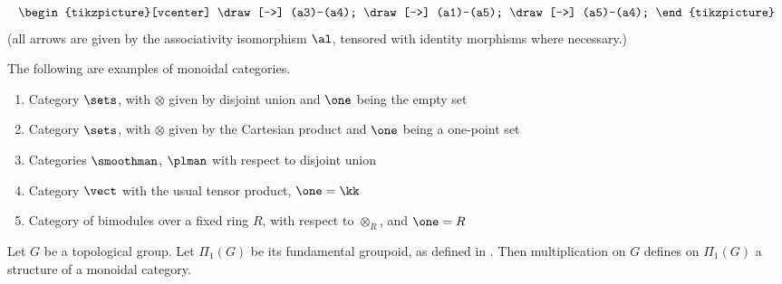 \begin{definition}
\begin{enumerate}
\begin{equation}
\begin{tikzpicture}[vcenter]
          \draw[->] (a3)--(a4);
          \draw[->] (a1)--(a5);
          \draw[->] (a5)--(a4);
        \end{tikzpicture}
      \end{equation}
      (all arrows are given by the associativity isomorphism $\al$, tensored
      with identity morphisms where necessary.)

  \end{enumerate}
\end{definition}

\begin{example}\label{x:monoidal-cat-examples}
The following are examples of monoidal categories.
  \begin{enumerate}
    \item Category $\sets$, with $\otimes$ given by disjoint union and
      $\one$ being the empty set
    \item Category $\sets$, with $\otimes$ given by the Cartesian product
      and $\one$ being a one-point set
    \item Categories $\smoothman$, $\plman$ with respect to disjoint union
    \item Category $\vect$ with the usual tensor product, $\one = \kk$
    \item Category of bimodules over a fixed ring $R$, with respect
      to $\otimes_R$, and $\one = R$

  \end{enumerate}
\end{example}

\begin{example}\label{x:fund-group}
  Let $G$ be a topological group. Let $\Pi_1(G)$ be its fundamental groupoid,
  as defined in . Then multiplication on $G$
  defines on $\Pi_1(G)$ a structure of a monoidal category.
\end{example}


